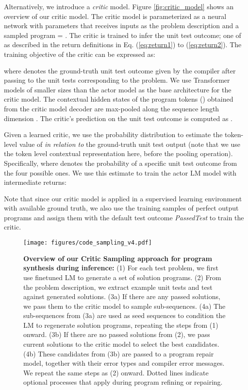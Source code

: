 \documentclass{article}
\begin{document}
Alternatively, we introduce a \emph{critic} model.
Figure \ref{fig:critic_model} shows an overview of our critic model.
The critic model is parameterized as a neural network with parameters  that receives inputs as the problem description  and a sampled program  = .
The critic is trained to infer the unit test outcome; one of  as described in the return definitions in Eq. (\ref{eq:return1}) to (\ref{eq:return2}). The training objective of the critic  can be expressed as: 

where  denotes the ground-truth unit test outcome given by the compiler after passing  to the unit tests corresponding to the problem.
We use Transformer models of smaller sizes than the actor model as the base architecture for the critic model. The contextual hidden states of the program tokens () obtained from the critic model decoder are max-pooled along the sequence length dimension . 
The critic's prediction on the unit test outcome is computed as .

Given a learned critic, we use the probability distribution  to estimate the token-level value  of  \emph{in relation to} the ground-truth unit test output (note that we use the token level contextual representation  here, before the pooling operation). Specifically,  where  denotes the probability of a specific unit test outcome from the four possible ones. We use this estimate to train the actor LM model with intermediate returns:





Note that since our critic model is applied in a supervised learning environment with available ground truth, we also use the training samples of perfect output programs  and assign them with the default test outcome  \emph{PassedTest} to train the critic.

\begin{figure}[t]
	\centering
	\resizebox{1.0\textwidth}{!} {
\texttt{[image: figures/code\_sampling\_v4.pdf]}
	}
	\caption{
	\textbf{Overview of our Critic Sampling approach for program synthesis during inference:} 
	(1) For each test problem, we first use finetuned LM to generate a set of solution programs. 
	(2) From the problem description, we extract example unit tests and test against generated solutions. 
	(3a) If there are any passed solutions, we pass them to the critic model to sample sub-sequences. 
	(4a) The sub-sequences from (3a) are used as seed sequences to condition the LM to regenerate solution programs, repeating the steps from (1) onward.
	(3b) If there are no passed solutions from (2), we pass current solutions to the critic model to select the best candidates.
	(4b) These candidates from (3b) are passed to a program repair model, together with their error types and compiler error messages. 
	We repeat the same steps as (2) onward. 
Dotted lines indicate optional processes that apply during program refining or repairing.
	}
\label{fig:critic_sampling}
\end{figure}
\end{document}
